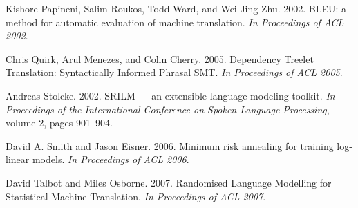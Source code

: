 \documentclass[11pt]{article}
\begin{document}
\begin{thebibliography}{}

Kishore Papineni, Salim Roukos, Todd Ward, and Wei-Jing Zhu. 2002.
BLEU: a method for automatic evaluation of machine translation.
\emph{In Proceedings of ACL 2002}.

Chris Quirk, Arul Menezes, and Colin Cherry. 2005.
Dependency Treelet Translation: Syntactically Informed Phrasal SMT.
\emph{In Proceedings of ACL 2005}. %
%

Andreas Stolcke. 2002. SRILM --- an extensible language
modeling toolkit. \emph{In Proceedings of the International
Conference on Spoken Language Processing}, volume 2, pages 901--904.


David A. Smith and Jason Eisner. 2006.
Minimum risk annealing for training log-linear models.
\emph{In Proceedings of ACL 2006}. %

David Talbot and Miles Osborne. 2007.
Randomised Language Modelling for Statistical Machine Translation.
\emph{In Proceedings of ACL 2007}.





\end{thebibliography}
\end{document}
